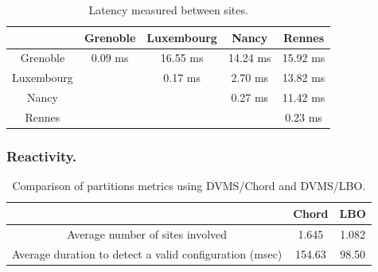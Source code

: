 \begin{table}[htbp]
\vspace*{-.3cm}
  \begin{center}
    \begin{tabular}{|c|c|c|c|c|}   

      \hline \multicolumn{1}{|p{2cm}|}{ } & \multicolumn{1}{|p{2cm}|}{\centering Grenoble }  & \multicolumn{1}{|p{2cm}|}{\centering Luxembourg } & \multicolumn{1}{|p{2cm}|}{\centering Nancy }& \multicolumn{1}{|p{2cm}|}{\centering Rennes } \\

      \hline
      Grenoble & 0.09 ms & 16.55 ms & 14.24 ms & 15.92 ms \\

      \hline
      Luxembourg &  & 0.17 ms & 2.70 ms & 13.82 ms \\

      \hline
      Nancy & &  & 0.27 ms & 11.42 ms \\

      \hline
      Rennes &  &  &  & 0.23 ms \\

      \hline
    \end{tabular}
  \end{center}
  \caption{\label{latency_table} Latency measured between sites.}
\vspace*{-1.3cm}
\end{table}

\subsubsection{Reactivity.}
\begin{table}[htbp]
\vspace*{-.6cm}
  \begin{center}
    \begin{tabular}{|c|c|c|}   

      \hline \multicolumn{1}{|p{3cm}|}{ }
       & \multicolumn{1}{|p{1.8cm}|}{\centering Chord }  & \multicolumn{1}{|p{1.8cm}|}{ \centering LBO}  \\

      \hline
      Average number of sites involved & 1.645 & 1.082 \\

      \hline
      Average duration to detect a valid configuration (msec) & 154.63 & 98.50 \\

      \hline
    \end{tabular}
  \end{center}
  \caption{\label{partitions_table} Comparison of partitions metrics
    using DVMS/Chord and DVMS/LBO.}
  \vspace{-.6cm}
\end{table}

